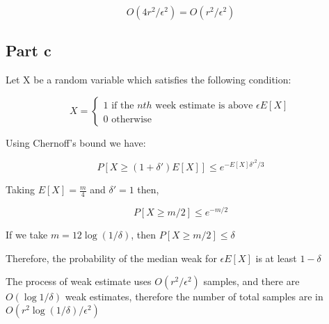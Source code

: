 \documentclass[12pt, a4paper]{article}
\begin{document}
\begin{equation}
  O(4r^2/\epsilon^2) = O(r^2/\epsilon^2)
\end{equation}

\subsection{Part c}
Let X be a random variable which satisfies the following condition:

\[
  X = \begin{cases}
    1 \text{ if the } nth \text{ week estimate is above } \epsilon E[X]\\
    0 \text{ otherwise}
  \end{cases}
\]

Using Chernoff's bound we have:

\begin{equation}
  P[X \geq (1 + \delta')E[X]] \leq e^{-E[X] \delta'^2 / 3}
\end{equation}

Taking $E[X] = \frac{m}{4}$ and $\delta' = 1$ then,

\begin{equation}
  P[X \geq m/2] \leq e^{-m / 2}
\end{equation}

If we take $m = 12 \log(1/ \delta)$, then $P[X \geq m/2] \leq \delta$

Therefore, the probability of the median weak for $\epsilon E[X]$ is at least $1
- \delta$

The process of weak estimate uses $O(r^2/ \epsilon^2)$ samples, and there are
$O(\log{1/ \delta})$ weak estimates, therefore the number of total samples are
in $O(r^2 \log(1 / \delta)/ \epsilon^2)$
\end{document}
